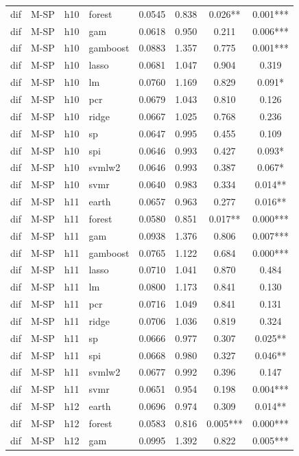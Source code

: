 \begin{ThreePartTable}
\begin{longtable}[t]{llclcccc}
dif & M-SP & h10 & forest & 0.0545 & 0.838 & 0.026** & 0.001***\\
dif & M-SP & h10 & gam & 0.0618 & 0.950 & 0.211 & 0.006***\\
dif & M-SP & h10 & gamboost & 0.0883 & 1.357 & 0.775 & 0.001***\\
dif & M-SP & h10 & lasso & 0.0681 & 1.047 & 0.904 & 0.319\\
dif & M-SP & h10 & lm & 0.0760 & 1.169 & 0.829 & 0.091*\\
dif & M-SP & h10 & pcr & 0.0679 & 1.043 & 0.810 & 0.126\\
dif & M-SP & h10 & ridge & 0.0667 & 1.025 & 0.768 & 0.236\\
dif & M-SP & h10 & sp & 0.0647 & 0.995 & 0.455 & 0.109\\
dif & M-SP & h10 & spi & 0.0646 & 0.993 & 0.427 & 0.093*\\
dif & M-SP & h10 & svmlw2 & 0.0646 & 0.993 & 0.387 & 0.067*\\
dif & M-SP & h10 & svmr & 0.0640 & 0.983 & 0.334 & 0.014**\\
\addlinespace
dif & M-SP & h11 & earth & 0.0657 & 0.963 & 0.277 & 0.016**\\
dif & M-SP & h11 & forest & 0.0580 & 0.851 & 0.017** & 0.000***\\
dif & M-SP & h11 & gam & 0.0938 & 1.376 & 0.806 & 0.007***\\
dif & M-SP & h11 & gamboost & 0.0765 & 1.122 & 0.684 & 0.000***\\
dif & M-SP & h11 & lasso & 0.0710 & 1.041 & 0.870 & 0.484\\
dif & M-SP & h11 & lm & 0.0800 & 1.173 & 0.841 & 0.130\\
dif & M-SP & h11 & pcr & 0.0716 & 1.049 & 0.841 & 0.131\\
dif & M-SP & h11 & ridge & 0.0706 & 1.036 & 0.819 & 0.324\\
dif & M-SP & h11 & sp & 0.0666 & 0.977 & 0.307 & 0.025**\\
dif & M-SP & h11 & spi & 0.0668 & 0.980 & 0.327 & 0.046**\\
dif & M-SP & h11 & svmlw2 & 0.0677 & 0.992 & 0.396 & 0.147\\
dif & M-SP & h11 & svmr & 0.0651 & 0.954 & 0.198 & 0.004***\\
\addlinespace
dif & M-SP & h12 & earth & 0.0696 & 0.974 & 0.309 & 0.014**\\
dif & M-SP & h12 & forest & 0.0583 & 0.816 & 0.005*** & 0.000***\\
dif & M-SP & h12 & gam & 0.0995 & 1.392 & 0.822 & 0.005***\\

\end{longtable}
\end{ThreePartTable}

